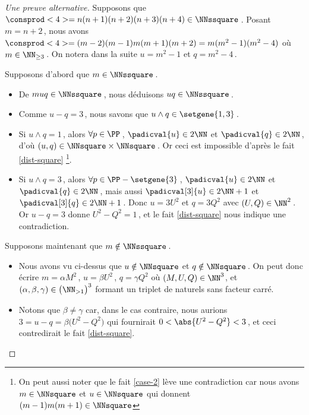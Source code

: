 \begin{proof}[Une preuve alternative]
	Supposons que $\consprod<4> = n(n+1)(n+2)(n+3)(n+4) \in \NNssquare$\,.
	Posant $m = n+2$\,, nous avons $\consprod<4> = (m-2)(m-1)m(m+1)(m+2) = m(m^2 - 1)(m^2 - 4)$ où $m \in \NN_{\geq 3}$\,.
	On notera dans la suite $u = m^2 - 1$ et $q = m^2 - 4$\,.
	
	\medskip
	
	Supposons d'abord que $m \in \NNssquare$\,.
	\begin{itemize}
		\item De $muq \in \NNssquare$\,, nous déduisons $uq \in \NNssquare$\,.

		\item Comme $u - q = 3$\,, nous savons que $u \wedge q \in \setgene{1, 3}$\,.

		\item Si $u \wedge q = 1$\,, 
		alors $\forall p \in \PP$\,, 
		$\padicval{u} \in 2 \NN$ et $\padicval{q} \in 2 \NN$\,,
		d'où 
		$(u, q) \in \NNsquare \times \NNsquare$\,.
		Or ceci est impossible d'après le fait \ref{dist-square}
		\footnote{
			On peut aussi noter que le fait \ref{case-2} lève une contradiction car nous avons $m \in \NNsquare$ et $u \in \NNsquare$ qui donnent $(m-1)m(m+1) \in \NNsquare$
		}.

		\item Si $u \wedge q = 3$\,, 
		alors $\forall p \in \PP - \setgene{3}$\,, 
		$\padicval{u} \in 2 \NN$ et $\padicval{q} \in 2 \NN$\,,
		mais aussi $\padicval[3]{u} \in 2 \NN + 1$ et $\padicval[3]{q} \in 2 \NN + 1$\,.
		Donc 
		$u = 3 U^2$ et $q = 3 Q^2$ avec $(U, Q) \in \NN^2$\,.
		Or $u - q = 3$ donne $U^2 - Q^2 = 1$\,, et le fait \ref{dist-square} nous indique une contradiction.
	\end{itemize}
	
	\medskip
	
	Supposons maintenant que $m \notin \NNssquare$\,.
	\begin{itemize}
		\item Nous avons vu ci-dessus que $u \notin \NNsquare$ et $q \notin \NNsquare$\,. On peut donc écrire $m = \alpha M^2$\,, $u = \beta U^2$\,, $q = \gamma Q^2$ où $(M, U, Q) \in \NN^3$, et $(\alpha, \beta, \gamma) \in \big( \NN_{>1} \big)^3$ formant un triplet de naturels sans facteur carré.


		\item Notons que $\beta \neq \gamma$ car, dans le cas contraire, nous aurions $3 = u - q = \beta \big( U^2 - Q^2 \big)$ qui fournirait $0 < \abs{U^2 - Q^2} < 3$\,, et ceci contredirait le fait \ref{dist-square}.



\end{itemize}
\end{proof}
